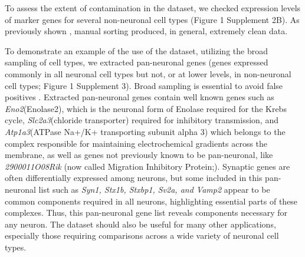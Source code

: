 To assess the extent of contamination in the dataset, we checked expression levels of marker genes for several non-neuronal cell types (Figure 1 Supplement 2B). As previously shown \citep{Okaty_2011}, manual sorting produced, in general, extremely clean data.

 To demonstrate an example of the use of the dataset, utilizing the broad sampling of cell types, we extracted pan-neuronal genes (genes expressed commonly in all neuronal cell types but not, or at lower levels, in non-neuronal cell types; Figure 1 Supplement 3). Broad sampling is essential to avoid false positives \citep{Zhang_2014,Mo_2015,Stefanakis_2015}. Extracted pan-neuronal genes contain well known genes such as \textit{Eno2}(Enolase2), which is the neuronal form of Enolase required for the Krebs cycle, \textit{Slc2a3}(chloride transporter) required for inhibitory transmission, and \textit{Atp1a3}(ATPase Na+/K+ transporting subunit alpha 3) which belongs to the complex responsible for maintaining electrochemical gradients across the membrane, as well as genes not previously known to be pan-neuronal, like \textit{2900011O08Rik} (now called Migration Inhibitory Protein;\cite{Zhang_2014a}). Synaptic genes are often differentially expressed among neurons, but some included in this pan-neuronal list such as \textit{Syn1, Stx1b, Stxbp1, Sv2a, and Vamp2} appear to be common components required in all neurons, highlighting essential parts of these complexes. Thus, this pan-neuronal gene list reveals components necessary for any neuron. The dataset should also be useful for many other applications, especially those requiring comparisons across a wide variety of neuronal cell types. 

